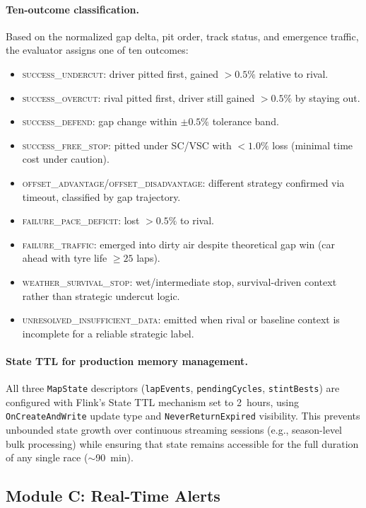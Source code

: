 \documentclass[a4paper,twocolumn]{article}
\begin{document}
\paragraph{Ten-outcome classification.}
Based on the normalized gap delta, pit order, track status, and
emergence traffic, the evaluator assigns one of ten outcomes:
\begin{itemize}
  \item \textsc{success\_undercut}: driver pitted first, gained
    $> 0.5\%$ relative to rival.
  \item \textsc{success\_overcut}: rival pitted first, driver still
    gained $> 0.5\%$ by staying out.
  \item \textsc{success\_defend}: gap change within $\pm 0.5\%$
    tolerance band.
  \item \textsc{success\_free\_stop}: pitted under SC/VSC with
    $< 1.0\%$ loss (minimal time cost under caution).
  \item \textsc{offset\_advantage}/\textsc{offset\_disadvantage}:
    different strategy confirmed via timeout, classified by gap
    trajectory.
  \item \textsc{failure\_pace\_deficit}: lost $> 0.5\%$ to rival.
  \item \textsc{failure\_traffic}: emerged into dirty air despite
    theoretical gap win (car ahead with tyre life $\geq 25$ laps).
  \item \textsc{weather\_survival\_stop}: wet/intermediate stop,
    survival-driven context rather than strategic undercut logic.
  \item \textsc{unresolved\_insufficient\_data}: emitted when rival
    or baseline context is incomplete for a reliable strategic label.
\end{itemize}

\paragraph{State TTL for production memory management.}
All three \texttt{MapState} descriptors (\texttt{lapEvents},
\texttt{pendingCycles}, \texttt{stintBests}) are configured with Flink's
State TTL mechanism set to 2~hours, using \texttt{OnCreateAndWrite}
update type and \texttt{NeverReturnExpired} visibility. This prevents
unbounded state growth over continuous streaming sessions (e.g.,
season-level bulk processing) while ensuring that state remains
accessible for the full duration of any single race ($\sim$90~min).

\subsection{Module C: Real-Time Alerts}
\end{document}
